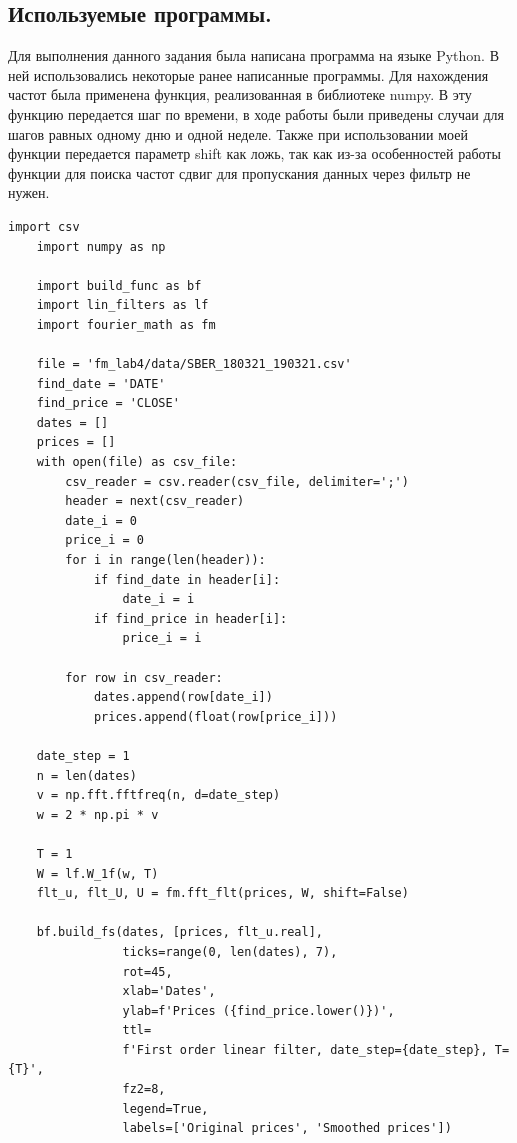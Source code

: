 \documentclass[a4paper, 12pt]{article}
\begin{document}
    \subsection{Используемые программы.}
    Для выполнения данного задания была написана программа на языке Python. В ней использовались
    некоторые ранее написанные программы. Для нахождения частот была применена функция, реализованная
    в библиотеке numpy. В эту функцию передается шаг по времени, в ходе работы были приведены случаи для
    шагов равных одному дню и одной неделе. Также при использовании моей функции передается параметр shift
    как ложь, так как из-за особенностей работы функции для поиска частот сдвиг для пропускания данных
    через фильтр не нужен.
    \begin{lstlisting}[label=task3, caption={Программа для сглаживания биржевых данных.}]
    import csv
    import numpy as np

    import build_func as bf
    import lin_filters as lf
    import fourier_math as fm

    file = 'fm_lab4/data/SBER_180321_190321.csv'
    find_date = 'DATE'
    find_price = 'CLOSE'
    dates = []
    prices = []
    with open(file) as csv_file:
        csv_reader = csv.reader(csv_file, delimiter=';')
        header = next(csv_reader)
        date_i = 0
        price_i = 0
        for i in range(len(header)):
            if find_date in header[i]:
                date_i = i
            if find_price in header[i]:
                price_i = i

        for row in csv_reader:
            dates.append(row[date_i])
            prices.append(float(row[price_i]))

    date_step = 1
    n = len(dates)
    v = np.fft.fftfreq(n, d=date_step)
    w = 2 * np.pi * v

    T = 1
    W = lf.W_1f(w, T)
    flt_u, flt_U, U = fm.fft_flt(prices, W, shift=False)

    bf.build_fs(dates, [prices, flt_u.real],
                ticks=range(0, len(dates), 7),
                rot=45,
                xlab='Dates',
                ylab=f'Prices ({find_price.lower()})',
                ttl=
                f'First order linear filter, date_step={date_step}, T={T}',
                fz2=8,
                legend=True,
                labels=['Original prices', 'Smoothed prices'])
    \end{lstlisting}
\end{document}
